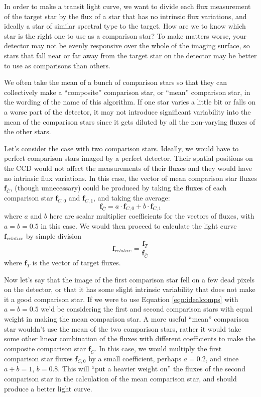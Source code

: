 \documentclass[a4paper]{article}
\begin{document}
In order to make a transit light curve, we want to divide each flux measurement of the target star by the flux of a star that has no intrinsic flux variations, and ideally a star of similar spectral type to the target. How are we to know which star is the right one to use as a comparison star? To make matters worse, your detector may not be evenly responsive over the whole of the imaging surface, so stars that fall near or far away from the target star on the detector may be better to use as comparisons than others. 

We often take the mean of a bunch of comparison stars so that they can collectively make a ``composite'' comparison star, or ``mean'' comparison star, in the wording of the name of this algorithm. If one star varies a little bit or falls on a worse part of the detector, it may not introduce significant variability into the mean of the comparison stars since it gets diluted by all the non-varying fluxes of the other stars. 

Let's consider the case with two comparison stars. Ideally, we would have to perfect comparison stars imaged by a perfect detector. Their spatial positions on the CCD would not affect the measurements of their fluxes and they would have no intrinsic flux variations. In this case, the vector of mean comparison star fluxes $\mathbf{f}_{\bar{C}}$, (though unnecessary) could be produced by taking the fluxes of each comparison star $\mathbf{f}_{C,0}$ and $\mathbf{f}_{C,1}$, and taking the average: 
\begin{equation} \label{eqn:idealcomps}
\mathbf{f}_{\bar{C}} = a \cdot \mathbf{f}_{C,0}  + b \cdot \mathbf{f}_{C,1}
\end{equation}
where $a$ and $b$ here are scalar multiplier coefficients for the vectors of fluxes, with $a = b = 0.5$ in this case. We would then proceed to calculate the light curve $\mathbf{f}_{relative}$ by simple division
\begin{equation}
\mathbf{f}_{relative}  = \frac{\mathbf{f}_{T}}{\mathbf{f}_{\bar{C}}}
\end{equation}
where $\mathbf{f}_{T}$ is the vector of target fluxes. 

Now let's say that the image of the first comparison star fell on a few dead pixels on the detector, or that it has some slight intrinsic variability that does not make it a good comparison star. If we were to use Equation \ref{eqn:idealcomps} with $a = b = 0.5$ we'd be considering the first and second comparison stars with equal weight in making the mean comparison star. A more useful ``mean'' comparison star wouldn't use the mean of the two comparison stars, rather it would take some other linear combination of the fluxes with different coefficients to make the composite comparison star $\mathbf{f}_{\bar{C}}$. In this case, we would multiply the first comparison star fluxes $\mathbf{f}_{C,0}$ by a small coefficient, perhaps $a = 0.2$, and since $a + b = 1$, $b=0.8$. This will ``put a heavier weight on'' the fluxes of the second comparison star in the calculation of the mean comparison star, and should produce a better light curve. 
\end{document}
